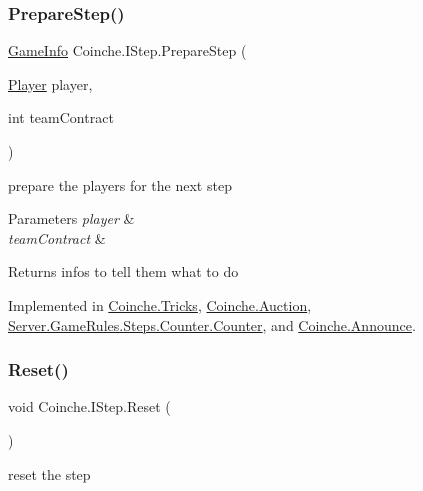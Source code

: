\subsubsection{\texorpdfstring{Prepare\+Step()}{PrepareStep()}}
{\footnotesize\ttfamily \hyperlink{class_coinche_1_1_tools_1_1_game_info}{Game\+Info} Coinche.\+I\+Step.\+Prepare\+Step (\begin{DoxyParamCaption}\item[{\hyperlink{class_coinche_1_1_player}{Player}}]{player,  }\item[{int}]{team\+Contract }\end{DoxyParamCaption})}



prepare the players for the next step 


\begin{DoxyParams}{Parameters}
{\em player} & \\
\hline
{\em team\+Contract} & \\
\hline
\end{DoxyParams}
\begin{DoxyReturn}{Returns}
infos to tell them what to do
\end{DoxyReturn}


Implemented in \hyperlink{class_coinche_1_1_tricks_a7d2fedfa7e574f3570d1be83943fa953}{Coinche.\+Tricks}, \hyperlink{class_coinche_1_1_auction_a9596ae8ce46f848244854d59c9bedadb}{Coinche.\+Auction}, \hyperlink{class_server_1_1_game_rules_1_1_steps_1_1_counter_1_1_counter_a84412648384fce7fea870e5e1e32bc3d}{Server.\+Game\+Rules.\+Steps.\+Counter.\+Counter}, and \hyperlink{class_coinche_1_1_announce_a24398cfbd8280465732c360858e72e13}{Coinche.\+Announce}.

\mbox{\label{interface_coinche_1_1_i_step_a764f20494a35e9b006c6495a38717e9a}} 
\subsubsection{\texorpdfstring{Reset()}{Reset()}}
{\footnotesize\ttfamily void Coinche.\+I\+Step.\+Reset (\begin{DoxyParamCaption}{ }\end{DoxyParamCaption})}



reset the step 



